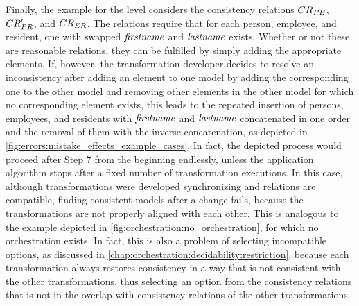 Finally, the example for the \levelnetworkrule level considers the consistency relations $\consistencyrelation{CR}{PE}$, $\consistencyrelation{CR}{PR}'$, and $\consistencyrelation{CR}{ER}$.
The relations require that for each person, employee, and resident, one with swapped $\mathit{firstname}$ and $\mathit{lastname}$ exists.
Whether or not these are reasonable relations, they can be fulfilled by simply adding the appropriate elements.
If, however, the transformation developer decides to resolve an inconsistency after adding an element to one model by adding the corresponding one to the other model and removing other elements in the other model for which no corresponding element exists, this leads to the repeated insertion of persons, employees, and residents with $\mathit{firstname}$ and $\mathit{lastname}$ concatenated in one order and the removal of them with the inverse concatenation, as depicted in \autoref{fig:errors:mistake_effects_example_cases}.
In fact, the depicted process would proceed after Step 7 from the beginning endlessly, unless the application algorithm stops after a fixed number of transformation executions.
In this case, although transformations were developed synchronizing and relations are compatible, finding consistent models after a change fails, because the transformations are not properly aligned with each other.
This is analogous to the example depicted in \autoref{fig:orchestration:no_orchestration}, for which no orchestration exists.
In fact, this is also a problem of selecting incompatible options, as discussed in \autoref{chap:orchestration:decidability:restriction}, because each transformation always restores consistency in a way that is not consistent with the other transformations, thus selecting an option from the consistency relations that is not in the overlap with consistency relations of the other transformations.


